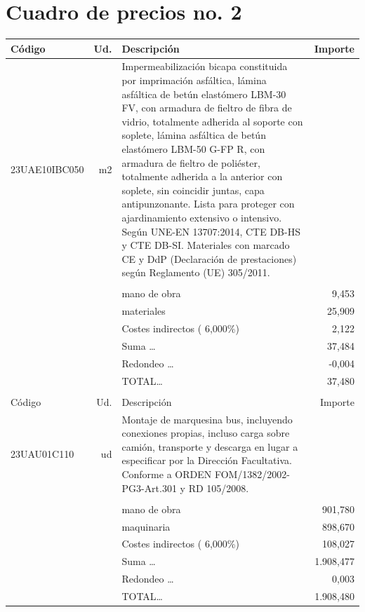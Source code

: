 \documentclass{book}%
\begin{document}
\part{Cuadro de precios no. 2}%
\label{sec:Cuadrodepreciosno.2}%
\parttoc%
\setcounter{chapter}{0}%
\small%
\tablefirsthead{}%
\tablehead{}%
%
\tablelasttail{}%
\begin{supertabular}{l r p{60mm} r}%
Código&Ud.&Descripción&Importe\\%
\hline%
23UAE10IBC050&m2&Impermeabilización bicapa constituida por imprimación asfáltica, lámina asfáltica de betún elastómero LBM{-}30 FV, con armadura de fieltro de fibra de vidrio, totalmente adherida al soporte con soplete, lámina asfáltica de betún elastómero LBM{-}50 G{-}FP R, con armadura de fieltro de poliéster, totalmente adherida a la anterior con soplete, sin coincidir juntas, capa antipunzonante. Lista para proteger con ajardinamiento extensivo o intensivo. Según UNE{-}EN 13707:2014, CTE DB{-}HS y CTE DB{-}SI. Materiales con marcado CE y DdP (Declaración de prestaciones) según Reglamento (UE) 305/2011.&\\%
&&&\\%
&&mano de obra&     9,453\\%
&&materiales&    25,909\\%
&&Costes indirectos (     6,000\%)&     2,122\\%
&&Suma \ldots&    37,484\\%
&&Redondeo \ldots&    {-}0,004\\%
%
&&TOTAL\ldots&    37,480\\%
&&&\\%
Código&Ud.&Descripción&Importe\\%
\hline%
23UAU01C110&ud&Montaje de marquesina bus, incluyendo conexiones propias, incluso carga sobre camión, transporte y descarga en lugar a especificar por la Dirección Facultativa. Conforme a ORDEN FOM/1382/2002{-}PG3{-}Art.301 y RD 105/2008.&\\%
&&&\\%
&&mano de obra&   901,780\\%
&&maquinaria&   898,670\\%
&&Costes indirectos (     6,000\%)&   108,027\\%
&&Suma \ldots& 1.908,477\\%
&&Redondeo \ldots&     0,003\\%
%
&&TOTAL\ldots& 1.908,480\\%

\end{supertabular}
\end{document}
